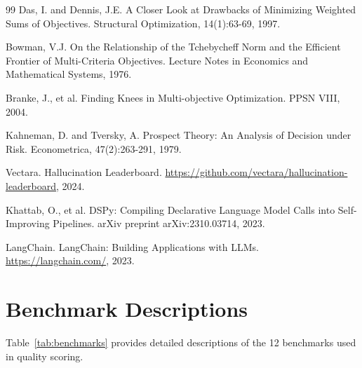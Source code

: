 \documentclass[11pt,a4paper]{article}
\begin{document}
\begin{thebibliography}{99}
Das, I. and Dennis, J.E.
\newblock A Closer Look at Drawbacks of Minimizing Weighted Sums of Objectives.
\newblock Structural Optimization, 14(1):63-69, 1997.

Bowman, V.J.
\newblock On the Relationship of the Tchebycheff Norm and the Efficient Frontier of Multi-Criteria Objectives.
\newblock Lecture Notes in Economics and Mathematical Systems, 1976.

Branke, J., et al.
\newblock Finding Knees in Multi-objective Optimization.
\newblock PPSN VIII, 2004.

Kahneman, D. and Tversky, A.
\newblock Prospect Theory: An Analysis of Decision under Risk.
\newblock Econometrica, 47(2):263-291, 1979.

Vectara.
\newblock Hallucination Leaderboard.
\newblock \url{https://github.com/vectara/hallucination-leaderboard}, 2024.

Khattab, O., et al.
\newblock DSPy: Compiling Declarative Language Model Calls into Self-Improving Pipelines.
\newblock arXiv preprint arXiv:2310.03714, 2023.

LangChain.
\newblock LangChain: Building Applications with LLMs.
\newblock \url{https://langchain.com/}, 2023.

\end{thebibliography}


\appendix

\section{Benchmark Descriptions}

Table~\ref{tab:benchmarks} provides detailed descriptions of the 12 benchmarks used in quality scoring.
\end{document}
